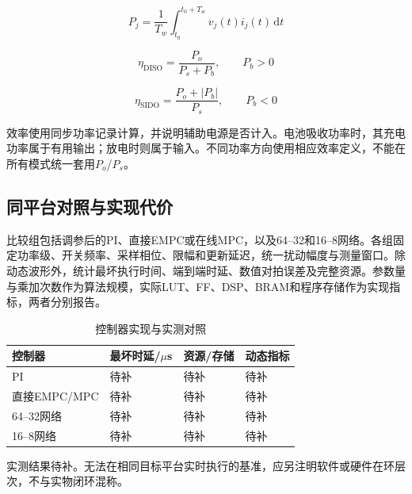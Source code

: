 \documentclass[UTF8,fontset=fandol,a4paper,twocolumn,10pt]{ctexart}
\begin{document}
\begin{center}
\label{fig:15}\end{center}

\begin{equation}P_j=\frac{1}{T_w}\int_{t_0}^{t_0+T_w}v_j(t)i_j(t)\,\mathrm dt\label{eq:44}\end{equation}

\begin{equation}\eta_{\mathrm{DISO}}=\frac{P_o}{P_s+P_b},\qquad P_b>0\label{eq:45}\end{equation}

\begin{equation}\eta_{\mathrm{SIDO}}=\frac{P_o+|P_b|}{P_s},\qquad P_b<0\label{eq:46}\end{equation}

效率使用同步功率记录计算，并说明辅助电源是否计入。电池吸收功率时，其充电功率属于有用输出；放电时则属于输入。不同功率方向使用相应效率定义，不能在所有模式统一套用$P_o$/$P_s$。


\subsection{同平台对照与实现代价}

比较组包括调参后的PI、直接EMPC或在线MPC，以及64–32和16–8网络。各组固定功率级、开关频率、采样相位、限幅和更新延迟，统一扰动幅度与测量窗口。除动态波形外，统计最坏执行时间、端到端时延、数值对拍误差及完整资源。参数量与乘加次数作为算法规模，实际LUT、FF、DSP、BRAM和程序存储作为实现指标，两者分别报告。

\begin{table}[!tp]\centering\caption{控制器实现与实测对照}\label{tab:10}\small\setlength{\tabcolsep}{3pt}
\begin{tabularx}{\textwidth}{YYYY}\toprule
\textbf{控制器} & \textbf{最坏时延/$\mu$s} & \textbf{资源/存储} & \textbf{动态指标}\\\midrule
PI & 待补 & 待补 & 待补\\
直接EMPC/MPC & 待补 & 待补 & 待补\\
64–32网络 & 待补 & 待补 & 待补\\
16–8网络 & 待补 & 待补 & 待补\\
\bottomrule\end{tabularx}
\par\vspace{3pt}\begin{minipage}{\textwidth}\footnotesize 实测结果待补。无法在相同目标平台实时执行的基准，应另注明软件或硬件在环层次，不与实物闭环混称。\end{minipage}
\end{table}
\end{document}

